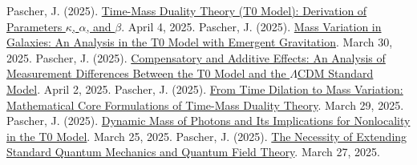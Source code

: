 \documentclass[a4paper,12pt]{article}
\begin{document}
	\begin{thebibliography}{99}
		 Pascher, J. (2025). \href{https://github.com/jpascher/T0-Time-Mass-Duality/tree/main/2/pdf/English/ZeitMasseT0ParamsEn.pdf}{Time-Mass Duality Theory (T0 Model): Derivation of Parameters \(\kappa\), \(\alpha\), and \(\beta\)}. April 4, 2025.
		 Pascher, J. (2025). \href{https://github.com/jpascher/T0-Time-Mass-Duality/tree/main/2/pdf/English/MassVarGalaxienEn.pdf}{Mass Variation in Galaxies: An Analysis in the T0 Model with Emergent Gravitation}. March 30, 2025.
		 Pascher, J. (2025). \href{https://github.com/jpascher/T0-Time-Mass-Duality/tree/main/2/pdf/English/MessdifferenzenT0StandardEn.pdf}{Compensatory and Additive Effects: An Analysis of Measurement Differences Between the T0 Model and the \(\Lambda\)CDM Standard Model}. April 2, 2025.
		 Pascher, J. (2025). \href{https://github.com/jpascher/T0-Time-Mass-Duality/tree/main/2/pdf/English/MathZeitMasseLagrange.pdf}{From Time Dilation to Mass Variation: Mathematical Core Formulations of Time-Mass Duality Theory}. March 29, 2025.
		 Pascher, J. (2025). \href{https://github.com/jpascher/T0-Time-Mass-Duality/tree/main/2/pdf/English/DynMassePhotonenNichtlokalEn.pdf}{Dynamic Mass of Photons and Its Implications for Nonlocality in the T0 Model}. March 25, 2025.
		 Pascher, J. (2025). \href{https://github.com/jpascher/T0-Time-Mass-Duality/tree/main/2/pdf/English/NotwendigkeitQMErweiterungEn.pdf}{The Necessity of Extending Standard Quantum Mechanics and Quantum Field Theory}. March 27, 2025.
	\end{thebibliography}
	
\end{document}
